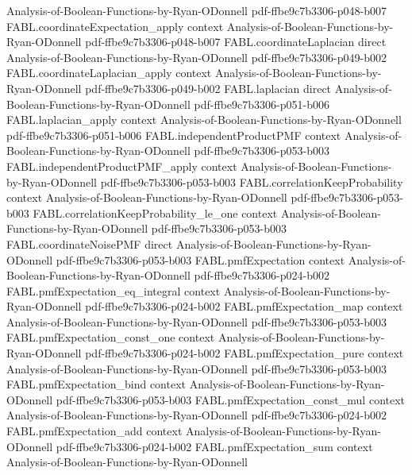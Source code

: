 \begin{theorem}
  {Analysis-of-Boolean-Functions-by-Ryan-ODonnell}
  {pdf-ffbe9c7b3306-p048-b007}
\proofstep
  {FABL.coordinateExpectation_apply}
  {context}
  {Analysis-of-Boolean-Functions-by-Ryan-ODonnell}
  {pdf-ffbe9c7b3306-p048-b007}
\proofstep
  {FABL.coordinateLaplacian}
  {direct}
  {Analysis-of-Boolean-Functions-by-Ryan-ODonnell}
  {pdf-ffbe9c7b3306-p049-b002}
\proofstep
  {FABL.coordinateLaplacian_apply}
  {context}
  {Analysis-of-Boolean-Functions-by-Ryan-ODonnell}
  {pdf-ffbe9c7b3306-p049-b002}
\proofstep
  {FABL.laplacian}
  {direct}
  {Analysis-of-Boolean-Functions-by-Ryan-ODonnell}
  {pdf-ffbe9c7b3306-p051-b006}
\proofstep
  {FABL.laplacian_apply}
  {context}
  {Analysis-of-Boolean-Functions-by-Ryan-ODonnell}
  {pdf-ffbe9c7b3306-p051-b006}
\proofstep
  {FABL.independentProductPMF}
  {context}
  {Analysis-of-Boolean-Functions-by-Ryan-ODonnell}
  {pdf-ffbe9c7b3306-p053-b003}
\proofstep
  {FABL.independentProductPMF_apply}
  {context}
  {Analysis-of-Boolean-Functions-by-Ryan-ODonnell}
  {pdf-ffbe9c7b3306-p053-b003}
\proofstep
  {FABL.correlationKeepProbability}
  {context}
  {Analysis-of-Boolean-Functions-by-Ryan-ODonnell}
  {pdf-ffbe9c7b3306-p053-b003}
\proofstep
  {FABL.correlationKeepProbability_le_one}
  {context}
  {Analysis-of-Boolean-Functions-by-Ryan-ODonnell}
  {pdf-ffbe9c7b3306-p053-b003}
\proofstep
  {FABL.coordinateNoisePMF}
  {direct}
  {Analysis-of-Boolean-Functions-by-Ryan-ODonnell}
  {pdf-ffbe9c7b3306-p053-b003}
\proofstep
  {FABL.pmfExpectation}
  {context}
  {Analysis-of-Boolean-Functions-by-Ryan-ODonnell}
  {pdf-ffbe9c7b3306-p024-b002}
\proofstep
  {FABL.pmfExpectation_eq_integral}
  {context}
  {Analysis-of-Boolean-Functions-by-Ryan-ODonnell}
  {pdf-ffbe9c7b3306-p024-b002}
\proofstep
  {FABL.pmfExpectation_map}
  {context}
  {Analysis-of-Boolean-Functions-by-Ryan-ODonnell}
  {pdf-ffbe9c7b3306-p053-b003}
\proofstep
  {FABL.pmfExpectation_const_one}
  {context}
  {Analysis-of-Boolean-Functions-by-Ryan-ODonnell}
  {pdf-ffbe9c7b3306-p024-b002}
\proofstep
  {FABL.pmfExpectation_pure}
  {context}
  {Analysis-of-Boolean-Functions-by-Ryan-ODonnell}
  {pdf-ffbe9c7b3306-p053-b003}
\proofstep
  {FABL.pmfExpectation_bind}
  {context}
  {Analysis-of-Boolean-Functions-by-Ryan-ODonnell}
  {pdf-ffbe9c7b3306-p053-b003}
\proofstep
  {FABL.pmfExpectation_const_mul}
  {context}
  {Analysis-of-Boolean-Functions-by-Ryan-ODonnell}
  {pdf-ffbe9c7b3306-p024-b002}
\proofstep
  {FABL.pmfExpectation_add}
  {context}
  {Analysis-of-Boolean-Functions-by-Ryan-ODonnell}
  {pdf-ffbe9c7b3306-p024-b002}
\proofstep
  {FABL.pmfExpectation_sum}
  {context}
  {Analysis-of-Boolean-Functions-by-Ryan-ODonnell}

\end{theorem}
